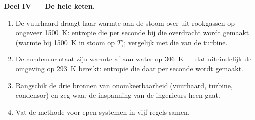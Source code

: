 \begin{problem}
\textbf{Deel IV --- De hele keten.}
\begin{enumerate}[resume]
  \item De vuurhaard draagt haar warmte aan de stoom over uit rookgassen op
        ongeveer \qty{1500}{K}: entropie die per seconde bij die overdracht
        wordt gemaakt
        (warmte bij \qty{1500}{K} in stoom op $\bar T$); vergelijk met die van de
        turbine.
  \item De condensor staat zijn warmte af aan water op \qty{306}{K} ---
        dat uiteindelijk de omgeving op \qty{293}{K} bereikt: entropie die
        daar per seconde wordt gemaakt.
  \item Rangschik de drie bronnen van onomkeerbaarheid (vuurhaard, turbine,
        condensor) en zeg waar de inspanning van de ingenieurs heen gaat.
  \item Vat de methode voor open systemen in vijf regels samen.
\end{enumerate}
\end{problem}
